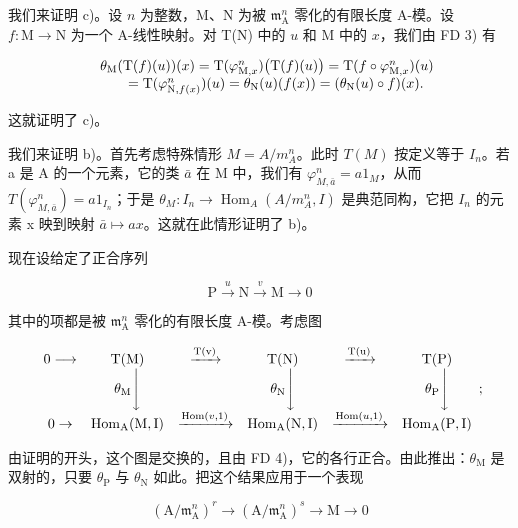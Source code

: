 我们来证明 c)。设 \(n\) 为整数，M、N 为被 \(\mathfrak{m}_{\mathrm{A}}^{n}\) 零化的有限长度 A-模。设 \(f: \mathrm{M} \to \mathrm{N}\) 为一个 A-线性映射。对 T(N) 中的 \(u\) 和 M 中的 \(x\)，我们由 FD 3) 有

\[
\begin{array}{r l} & {\theta_ {\mathrm{M}} (\mathrm{T} (f) (u)) (x) = \mathrm{T} (\varphi_ {\mathrm{M}, x} ^ {n}) \big (\mathrm{T} (f) (u) \big) = \mathrm{T} (f \circ \varphi_ {\mathrm{M}, x} ^ {n}) (u)} \\ & {\qquad = \mathrm{T} (\varphi_ {\mathrm{N}, f (x)} ^ {n}) (u) = \theta_ {\mathrm{N}} (u) (f (x)) = (\theta_ {\mathrm{N}} (u) \circ f) (x).} \end{array}
\]

这就证明了 c)。

我们来证明 b)。首先考虑特殊情形 \(M = A/m_{A}^{n}\)。此时 \(T(M)\) 按定义等于 \(I_{n}\)。若 a 是 A 的一个元素，它的类 \(\bar{a}\) 在 M 中，我们有 \(\varphi_{M,\bar{a}}^{n} = a1_{M}\)，从而 \(T(\varphi_{M,\bar{a}}^{n}) = a1_{I_{n}}\)；于是 \(\theta_{M}: I_{n} \longrightarrow \operatorname{Hom}_{A}(A/m_{A}^{n}, I)\) 是典范同构，它把 \(I_{n}\) 的元素 x 映到映射 \(\bar{a} \mapsto ax\)。这就在此情形证明了 b)。

现在设给定了正合序列

\[
\mathrm{P} \xrightarrow {u} \mathrm{N} \xrightarrow {v} \mathrm{M} \to 0
\]

其中的项都是被 \(\mathfrak{m}_{\mathrm{A}}^{n}\) 零化的有限长度 A-模。考虑图

\[
\begin{array}{c c c c c c} 0 \longrightarrow & \mathrm{T(M)} & \xrightarrow {\mathrm{T(v)}} & \mathrm{T(N)} & \xrightarrow {\mathrm{T(u)}} & \mathrm{T(P)} \\ & \theta_ {\mathrm{M}} \Bigg \downarrow & & \theta_ {\mathrm{N}} \Bigg \downarrow & & \theta_ {\mathrm{P}} \Bigg \downarrow \\ 0 \to & \operatorname{Hom} _ {\mathrm{A}} (\mathrm{M}, \mathrm{I}) & \xrightarrow {\operatorname{Hom} (v , 1)} & \operatorname{Hom} _ {\mathrm{A}} (\mathrm{N}, \mathrm{I}) & \xrightarrow {\operatorname{Hom} (u , 1)} & \operatorname{Hom} _ {\mathrm{A}} (\mathrm{P}, \mathrm{I}) \end{array} ;
\]

由证明的开头，这个图是交换的，且由 FD 4)，它的各行正合。由此推出：\(\theta_{\mathrm{M}}\) 是双射的，只要 \(\theta_{\mathrm{P}}\) 与 \(\theta_{\mathrm{N}}\) 如此。把这个结果应用于一个表现

\[
\left(\mathrm{A} / \mathfrak {m} _ {\mathrm{A}} ^ {n}\right) ^ {r} \longrightarrow \left(\mathrm{A} / \mathfrak {m} _ {\mathrm{A}} ^ {n}\right) ^ {s} \longrightarrow \mathrm{M} \rightarrow 0
\]

